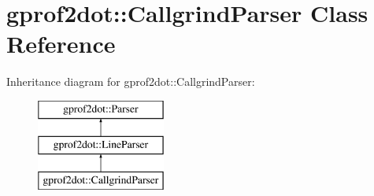 \hypertarget{classgprof2dot_1_1CallgrindParser}{
\section{gprof2dot::CallgrindParser Class Reference}
\label{classgprof2dot_1_1CallgrindParser}
}
Inheritance diagram for gprof2dot::CallgrindParser:\begin{figure}[H]
\begin{center}
\leavevmode
\includegraphics[height=3.000000cm]{classgprof2dot_1_1CallgrindParser}
\end{center}
\end{figure}

